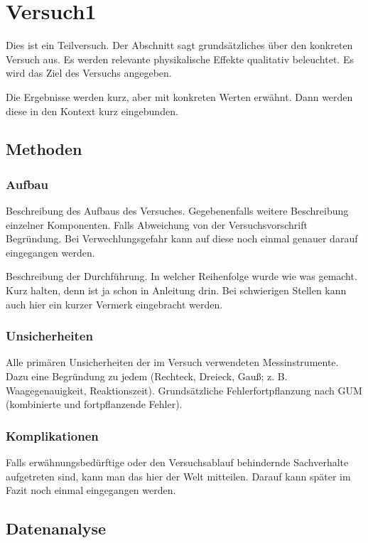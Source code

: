 \section{Versuch1} 

Dies ist ein Teilversuch.
Der Abschnitt sagt grundsätzliches über den konkreten Versuch aus.
Es werden relevante physikalische Effekte qualitativ beleuchtet.
Es wird das Ziel des Versuchs angegeben.

Die Ergebnisse werden kurz, aber mit konkreten Werten erwähnt.
Dann werden diese in den Kontext kurz eingebunden.

\subsection{Methoden}

\subsubsection{Aufbau}

Beschreibung des Aufbaus des Versuches.
Gegebenenfalls weitere Beschreibung einzelner Komponenten.
Falls Abweichung von der Versuchsvorschrift Begründung.
Bei Verwechlungsgefahr kann  auf diese noch einmal genauer darauf eingegangen werden.

Beschreibung der Durchführung.
In welcher Reihenfolge wurde wie was gemacht.
Kurz halten, denn ist ja schon in Anleitung drin.
Bei schwierigen Stellen kann auch hier ein kurzer Vermerk eingebracht werden.

\subsubsection{Unsicherheiten}

Alle primären Unsicherheiten der im Versuch verwendeten Messinstrumente.
Dazu eine Begründung zu jedem (Rechteck, Dreieck, Gauß; z. B. Waagegenauigkeit, Reaktionszeit).
Grundsätzliche Fehlerfortpflanzung nach GUM (kombinierte und fortpflanzende Fehler).

\subsubsection{Komplikationen}

Falls erwähnungsbedürftige oder den Versuchsablauf behindernde Sachverhalte aufgetreten sind, kann man das hier der Welt mitteilen.
Darauf kann später im Fazit noch einmal eingegangen werden.

\subsection{Datenanalyse}

